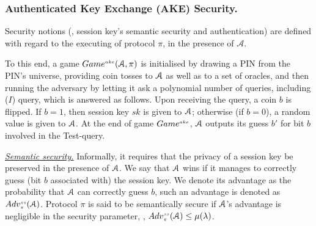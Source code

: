 %
%
%
%
%
%
%
%
%
%
%
%
%
%  
%  
%  

 \vspace{-1mm}
\subsubsection{Authenticated Key Exchange (AKE)  Security.} Security notions (\ie, session key's semantic security and authentication) are defined with regard to the executing of protocol $\pi$, in the presence of   $\mathcal{A}$. 


To this end, a game $Game^{\scriptscriptstyle ake} (\mathcal{A},\pi)$ is initialised by drawing a PIN  from the PIN's universe,
providing coin tosses to $\mathcal{A}$ as well as to a set of oracles, and then running the adversary by letting it ask a polynomial
number of queries, including \test($I$) query, which is answered as follows. Upon receiving the query, a coin $b$ is flipped. If $b=1$, then session key $sk$ is given to $\mathcal{A}$; otherwise (if $b=0$), a random value is given to $\mathcal{A}$. At the end of game $Game^{\scriptscriptstyle ake}$, $\mathcal{A}$  outputs its guess $b'$ for  bit $b$ involved in the Test-query. 



\noindent\underline{\textit{Semantic security.}} Informally, it requires that the privacy of a session key be preserved in the presence of $\mathcal{A}$. We say that $\mathcal{A}$  wins if it manages to correctly guess (bit $b$ associated with) the session key. We denote its advantage as the probability that $\mathcal{A}$  can correctly guess $b$, such an advantage is denoted as  $Adv_{\scriptscriptstyle\pi}^{\scriptscriptstyle ss}(\mathcal{A})$.  Protocol $\pi$ is said to be semantically secure if $\mathcal{A}$'s advantage is negligible in the security parameter, \ie, $Adv_{\scriptscriptstyle\pi}^{\scriptscriptstyle ss}(\mathcal{A})\leq \mu(\lambda)$.



